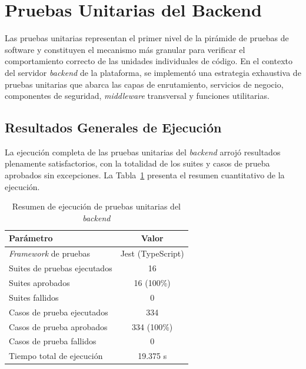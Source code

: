 
\section{Pruebas Unitarias del Backend}
\label{sec:pruebas-unitarias-backend}

Las pruebas unitarias representan el primer nivel de la pir\'amide de pruebas
de software y constituyen el mecanismo m\'as granular para verificar el
comportamiento correcto de las unidades individuales de c\'odigo. En el contexto
del servidor \textit{backend} de la plataforma, se implement\'o una estrategia
exhaustiva de pruebas unitarias que abarca las capas de enrutamiento, servicios
de negocio, componentes de seguridad, \textit{middleware} transversal y
funciones utilitarias.

\subsection{Resultados Generales de Ejecuci\'on}
\label{subsec:resultados-unitarias}

La ejecuci\'on completa de las pruebas unitarias del \textit{backend} arroj\'o
resultados plenamente satisfactorios, con la totalidad de los suites y casos
de prueba aprobados sin excepciones. La Tabla~\ref{tab:resumen-unitarias}
presenta el resumen cuantitativo de la ejecuci\'on.

\begin{table}[htbp]
\centering
\caption{Resumen de ejecuci\'on de pruebas unitarias del \textit{backend}}
\label{tab:resumen-unitarias}
\begin{tabular}{|l|c|}
\hline
\textbf{Par\'ametro} & \textbf{Valor} \\
\hline
\textit{Framework} de pruebas         & Jest (TypeScript) \\
\hline
Suites de pruebas ejecutados          & 16 \\
\hline
Suites aprobados                      & 16 (100\%) \\
\hline
Suites fallidos                       & 0 \\
\hline
Casos de prueba ejecutados            & 334 \\
\hline
Casos de prueba aprobados             & 334 (100\%) \\
\hline
Casos de prueba fallidos              & 0 \\
\hline
Tiempo total de ejecuci\'on           & 19.375 s \\
\hline
\end{tabular}
\end{table}

